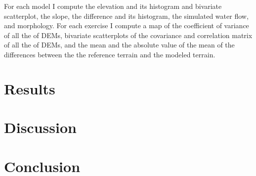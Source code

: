 \documentclass{isprs}
\begin{document}
For each model I compute the elevation and its histogram 
and bivariate scatterplot, the slope, the difference and its histogram, 
the simulated water flow, and morphology. 
For each exercise I compute 
a map of the coefficient of variance of all the of DEMs,
bivariate scatterplots of
the covariance and correlation matrix of all the of DEMs,
and the mean and the absolute value of the mean of the 
differences between the the reference terrain and the modeled terrain.



\section{Results}\label{sec:results}



\section{Discussion}\label{sec:discussion}



\section{Conclusion}\label{sec:conclusion}

\end{document}
